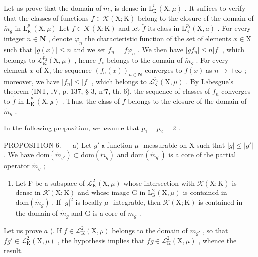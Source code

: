 Let us prove that the domain of \(\widetilde{m}_g\) is dense in \(\mathrm{L}_{\mathrm{K}}^{p_1}(\mathrm{X},\mu)\) . It suffices to verify that the classes of functions \(f\in \mathcal{K}(\mathrm{X};\mathrm{K})\) belong to the closure of the domain of \(\widetilde{m}_g\) in \(\mathrm{L}_{\mathrm{K}}^{p_1}(\mathrm{X},\mu)\) Let \(f\in \mathcal{K}(\mathrm{X};\mathrm{K})\) and let \(\widetilde{f}\) its class in \(\mathrm{L}_{\mathrm{K}}^{p_1}(\mathrm{X},\mu)\) . For every integer \(n\in \mathbf{N}\) , denote \(\varphi_{n}\) the characteristic function of the set of elements \(x\in \mathrm{X}\) such that \(|g(x)|\leqslant n\) and we set \(f_{n} = f\varphi_{n}\) . We then have \(|gf_n|\leqslant n|f|\) , which belongs to \(\mathcal{L}_{\mathrm{K}}^{p_2}(\mathrm{X},\mu)\) , hence \(f_{n}\) belongs to the domain of \(\widetilde{m}_g\) . For every element \(x\) of X, the sequence \((f_n(x))_{n\in \mathbf{N}}\) converges to \(f(x)\) as \(n\to +\infty\) ; moreover, we have \(|f_n|\leqslant |f|\) , which belongs to \(\mathcal{L}_{\mathrm{K}}^{p_1}(\mathrm{X},\mu)\) . By Lebesgue's theorem (INT, IV, p. 137, § 3, n°7, th. 6), the sequence of classes of \(f_{n}\) converges to \(\widetilde{f}\) in \(\mathrm{L}_{\mathrm{K}}^{p_1}(\mathrm{X},\mu)\) . Thus, the class of \(f\) belongs to the closure of the domain of \(\widetilde{m}_g\) .

In the following proposition, we assume that \(p_1 = p_2 = 2\) .

PROPOSITION 6. --- a) Let \(g'\) a function \(\mu\) -measurable on X such that \(|g|\leqslant |g'|\) . We have \(\mathrm{dom}(\widetilde{m}_{g'})\subset\mathrm{dom}(\widetilde{m}_{g})\) and \(\mathrm{dom}(\widetilde{m}_{g'})\) is a core of the partial operator \(\widetilde{m}_{g}\) ;

\begin{enumerate}
\def\labelenumi{\alph{enumi})}
\setcounter{enumi}{1}
\tightlist
\item
  Let F be a subspace of \(\mathcal{L}_{\mathrm{K}}^{2}(\mathrm{X},\mu)\) whose intersection with \(\mathcal{K}(\mathrm{X};\mathrm{K})\) is dense in \(\mathcal{K}(\mathrm{X};\mathrm{K})\) and whose image G in \(\mathrm{L}_{\mathrm{K}}^{2}(\mathrm{X},\mu)\) is contained in \(\mathrm{dom}(\widetilde{m}_g)\) . If \(|g|^2\) is locally \(\mu\) -integrable, then \(\mathcal{K}(\mathrm{X};\mathrm{K})\) is contained in the domain of \(\widetilde{m}_g\) and G is a core of \(m_g\) .
\end{enumerate}

Let us prove \(a\) ). If \(f \in \mathcal{L}_{\mathrm{K}}^{2}(\mathrm{X}, \mu)\) belongs to the domain of \(m_{g'}\) , so that \(fg' \in \mathcal{L}_{\mathrm{K}}^{2}(\mathrm{X}, \mu)\) , the hypothesis implies that \(fg \in \mathcal{L}_{\mathrm{K}}^{2}(\mathrm{X}, \mu)\) , whence the result.

